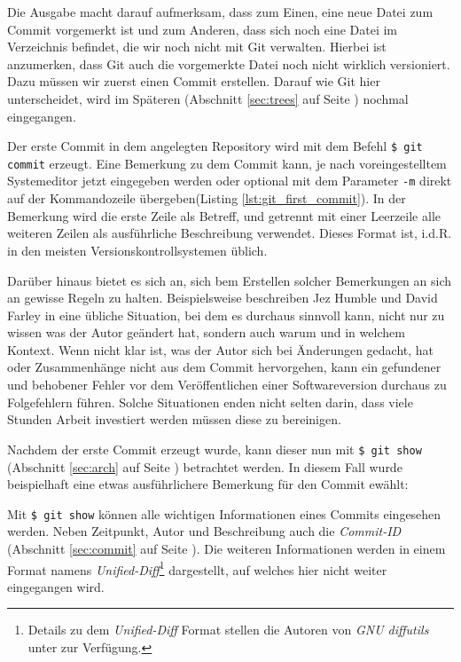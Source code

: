 Die Ausgabe macht darauf aufmerksam, dass zum Einen, eine neue Datei zum Commit
vorgemerkt ist und zum Anderen, dass sich noch eine Datei im Verzeichnis
befindet, die wir noch nicht mit Git verwalten. Hierbei ist anzumerken, dass
Git auch die vorgemerkte Datei noch nicht wirklich versioniert. Dazu müssen wir
zuerst einen Commit erstellen. Darauf wie Git hier unterscheidet, wird im
Späteren (Abschnitt \ref{sec:trees} auf Seite \pageref{sec:trees}) nochmal
eingegangen.

Der erste Commit in dem angelegten Repository wird mit dem Befehl \texttt{\$
git commit} erzeugt. Eine Bemerkung zu dem Commit kann, je nach
voreingestelltem Systemeditor jetzt eingegeben werden oder optional mit dem
Parameter \texttt{-m} direkt auf der Kommandozeile übergeben(Listing
\ref{lst:git_first_commit}). In der Bemerkung wird die erste Zeile als Betreff,
und getrennt mit einer Leerzeile alle weiteren Zeilen als ausführliche
Beschreibung verwendet. Dieses Format ist, i.d.R. in den meisten
Versionskontrollsystemen üblich.



Darüber hinaus bietet es sich an, sich bem Erstellen solcher Bemerkungen an sich
an gewisse Regeln zu halten. Beispielsweise beschreiben Jez Humble und David
Farley in \cite[S.~37]{cd} eine übliche Situation, bei dem es durchaus sinnvoll
kann, nicht nur zu wissen was der Autor geändert hat, sondern auch warum
und in welchem Kontext. Wenn nicht klar ist, was der Autor sich bei
Änderungen gedacht, hat oder Zusammenhänge nicht aus dem Commit hervorgehen, kann
ein gefundener und behobener Fehler vor dem Veröffentlichen einer
Softwareversion durchaus zu Folgefehlern führen. Solche Situationen enden
nicht selten darin, dass viele Stunden Arbeit investiert werden müssen diese zu
bereinigen.\cite[S.~37]{cd}

Nachdem der erste Commit erzeugt wurde, kann dieser nun mit \texttt{\$ git
show} (Abschnitt \ref{sec:arch} auf Seite \pageref{sec:arch}) betrachtet
werden. In diesem Fall wurde beispielhaft eine etwas ausführlichere Bemerkung
für den Commit ewählt:



Mit \texttt{\$ git show} können alle wichtigen Informationen eines Commits
eingesehen werden.  Neben Zeitpunkt, Autor und Beschreibung auch die
\textit{Commit-ID} (Abschnitt \ref{sec:commit} auf Seite \pageref{sec:commit}).
Die weiteren Informationen werden in einem Format namens
\textit{Unified-Diff}\footnote{Details zu dem \textit{Unified-Diff} Format
stellen die Autoren von \textit{GNU diffutils} unter
\cite[S.~12-13]{paper:diffutils} zur Verfügung.} dargestellt, auf welches hier
nicht weiter eingegangen wird.\cite[25]{gitosp}

